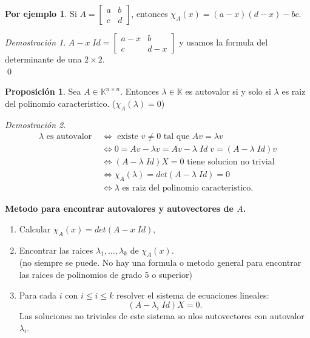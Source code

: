 \documentclass{article}
\theoremstyle{definition}
\theoremstyle{definition}
\newtheorem{prop}[teo]{Proposición}
\newtheorem*{ej}{Por ejemplo}
\theoremstyle{remark}
\newtheorem*{demo}{Demostración}
\begin{document}
\begin{ej}
  Si $A=\begin{bmatrix}a & b \\ c & d \end{bmatrix}$, entonces $\chi_A(x)=(a-x)(d-x)-bc$. 
\end{ej}
\begin{demo}
  $A-x \; Id=\begin{bmatrix} a -x & b \\ c & d-x \end{bmatrix}$ y usamos la formula del determinante de una $2 \times 2$. 
  \\ \qed
\end{demo}
\pagebreak

\begin{prop}
  Sea $A \in \mathbb{K}^{n \times n}$. Entonces $\lambda \in \mathbb{K}$ es autovalor si y solo si $\lambda$ es raiz del polinomio caracteristico. ($\chi_A(\lambda)=0$)
\end{prop}
\begin{demo}
  \[
    \begin{aligned}
      \lambda \text{ es autovalor } & \Leftrightarrow  \text{ existe } v \neq 0 \text{ tal que } Av=\lambda v \\
                                    & \Leftrightarrow 0 = Av-\lambda v = Av-\lambda \; Id \; v = (A-\lambda \; Id)v \\
                                    & \Leftrightarrow (A-\lambda \; Id) X = 0 \text{ tiene solucion no trivial} \\
                                    & \Leftrightarrow \chi_A(\lambda)=det(A-\lambda \; Id)=0 \\
                                    & \Leftrightarrow \lambda \text{ es raiz del polinomio caracteristico.}
    \end{aligned}
  \]
\end{demo}
\begin{center}
\textbf{Metodo para encontrar autovalores y autovectores de $A$.}
\end{center}
\begin{enumerate}[label=\arabic*.]
  \item Calcular $\chi_A(x)=det(A-x \; Id)$,
  \item Encontrar las raices $\lambda_1, \dots , \lambda_{k}$ de $\chi_A(x)$. \\
    (no siempre se puede. No hay una formula o metodo general para encontrar las raices de polinomios de grado $5$ o superior)
  \item Para cada $i$ con $i \leq i \leq k$ resolver el sistema de ecuaciones lineales: \[
      (A-\lambda_i \; Id) X = 0.
    \]
    Las soluciones no triviales de este sistema so nlos autovectores con autovalor $\lambda_i$.
\end{enumerate}
\end{document}
